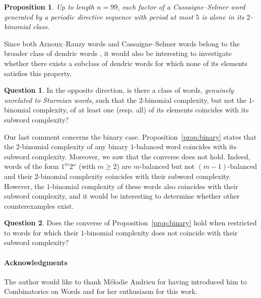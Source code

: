\documentclass{template_arxiv}
\newtheorem{proposition}[lemma]{Proposition}
\theoremstyle{definition}
\newtheorem{question}{Question}
\begin{document}
\begin{proposition}
Up to length $n=99$, each factor of a Cassaigne--Selmer word generated by a periodic directive sequence with period at most $5$ is alone in its $2$-binomial class.
\end{proposition}

Since both Arnoux--Rauzy words and Cassaigne--Selmer words belong to the broader class of dendric words \cite{BDDLPRR15,BDDLP18}, it would also be interesting to investigate whether there exists a subclass of dendric words for which none of its elements satisfies this property.

\begin{question}
In the opposite direction, is there a class of words, \emph{genuinely unrelated to Sturmian words}, such that the $2$-binomial complexity, but not the $1$-binomial complexity, of at least one (resp. all) of its elements coincides with its subword complexity?
\end{question}

\medskip

Our last comment concerns the binary case. Proposition~\ref{prop:binary} states that the $2$-binomial complexity of any binary $1$-balanced word coincides with its subword complexity. Moreover, we saw that the converse does not hold. Indeed, words of the form $1^m 2^\omega$ (with $m\geq 2$) are $m$-balanced but not $(m-1)$-balanced and their $2$-binomial complexity coincides with their subword complexity. However, the $1$-binomial complexity of these words also coincides with their subword complexity, and it would be interesting to determine whether other counterexamples exist.

\begin{question}
Does the converse of Proposition~\ref{prop:binary} hold when restricted to words for which their $1$-binomial complexity does not coincide with their subword complexity?
\end{question}

% 
%

\paragraph{Acknowledgments} The author would like to thank M\'elodie Andrieu for having introduced him to Combinatorics on Words and for her enthusiasm for this work.

\small


\end{document}
